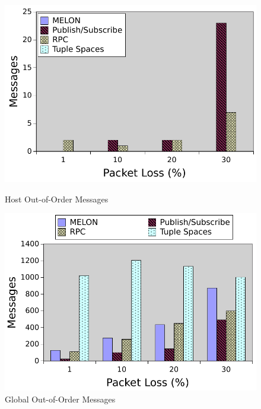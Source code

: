 \documentclass{llncs}
\begin{document}
\begin{figure}[ht]
\centering
\begin{minipage}[b]{0.48\linewidth}
\includegraphics[width = \textwidth]{figures/hooo.pdf}
\caption{Host Out-of-Order Messages}
\label{fig:hooo}
\end{minipage}
\quad
\begin{minipage}[b]{0.48\linewidth}
\includegraphics[width = \textwidth]{figures/gooo.pdf}
\caption{Global Out-of-Order Messages}
\label{fig:gooo}
\end{minipage}
\end{figure}
\end{document}
